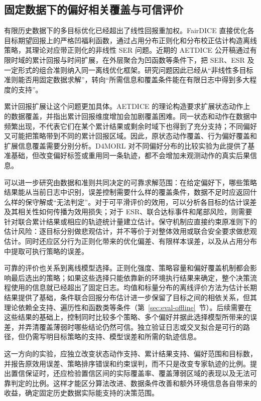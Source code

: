 \subsection{固定数据下的偏好相关覆盖与可信评价}\label{sec:future-offline}

有限历史数据下的多目标优化已经超出了线性回报重加权。FairDICE 直接优化各目标期望回报上的严格凹福利函数，通过占用分布正则化和分布校正估计构造离线策略，其理论对应带正则化的非线性 SER 问题\cite{kim2025fairdice}。近期的 AETDICE 公开稿通过有限时域的累计回报与时间扩展，在外层聚合为凹函数等条件下，把 SER、ESR 及一定形式的组合准则纳入同一离线优化框架\cite{kim2026aetdice}。研究问题因此已经从“非线性多目标准则能否用固定数据求解”，转向“所需信息和覆盖条件能在有限日志中得到多大程度的支持”。

累计回报扩展让这个问题更加具体。AETDICE 的理论构造要求扩展状态动作上的数据覆盖，并指出累计回报维度增加会加剧覆盖困难\cite{kim2026aetdice}。同一状态和动作在数据中频繁出现，不代表它们在某个累计结果或剩余时域下也得到了充分支持；不同偏好又可能把策略带到不同的累计回报区域。因此，原状态动作覆盖、行为偏好覆盖和扩展信息覆盖需要分别分析。D4MORL 对不同偏好分布的比较实验为此提供了基准基础\cite{zhu2023}，但改变偏好标签或重用同一条轨迹，都不会增加未观测动作的真实后果信息。

可以进一步研究由数据和准则共同决定的可靠求解范围：在给定偏好下，哪些策略结果能从当前日志中识别，误差控制需要什么样的覆盖条件，数据不足时应返回什么样的保守解或“无法判定”。对于可平滑评价的效用，可以分析各目标的估计误差及其相关性如何传播为效用损失；对于 ESR、联合达标事件和尾部风险，则需要针对联合累计结果或相应的轨迹统计量建立估计。保守机制应直接约束原准则下的估计风险：逐目标分别做悲观估计，并不等价于对整体效用或联合安全要求做悲观估计。同时还应区分行为正则化带来的优化偏差、有限样本误差，以及从占用分布中提取可执行策略的误差。

可靠的评价也关系到离线模型选择。正则化强度、策略容量和偏好覆盖机制都会影响最后选出的策略；如果这些选择只能依靠新的环境执行结果来确定，整个决策流程使用的信息就已经超出了固定日志。均值和标量分布的离线评价方法为估计长期结果提供了基础\cite{jiang2016,chandak2021}，条件联合回报分布估计进一步保留了目标之间的相依关系，但其理论依赖全支持、遍历性和函数类等条件\cite{qi2025distributional}（第~\ref{sec:eval-offline}~节）。后续需要在这些结果的基础上，控制同时比较多个策略、多个偏好并据此选择模型所带来的误差，并弄清覆盖薄弱时哪些结论仍然可信。独立验证日志或交叉拟合是可行的路径，但仍需写明目标策略的支持、模型误差和所需的轨迹信息。

这一方向的实验，应独立改变状态动作支持、累计结果支持、偏好范围和目标数，并报告原效用误差、策略排序错误和约束误判，而不只是改变专家轨迹的比例。提出置信保证时，还应检验置信区间的实际覆盖率、覆盖薄弱区域的表现以及无法可靠判定的比例。这样才能区分算法改进、数据条件改善和额外环境信息各自带来的收益，确定固定历史数据实际能支持的决策范围。

